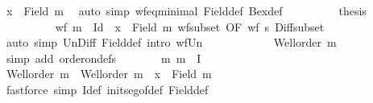 \begin{isabellebody}
\ {\isacartoucheopen}x\ {\isasymnotin}\ Field\ m{\isacartoucheclose}\ \isamarkupfalse%
\ {\isacharparenleft}{\kern0pt}auto\ simp{\isacharcolon}{\kern0pt}\ wf{\isacharunderscore}{\kern0pt}eq{\isacharunderscore}{\kern0pt}minimal\ Field{\isacharunderscore}{\kern0pt}def\ Bex{\isacharunderscore}{\kern0pt}def{\isacharparenright}{\kern0pt}\isanewline
\ \ \ \ \ \ \isamarkupfalse%
\ \isamarkupfalse%
\ {\isacharquery}{\kern0pt}thesis\isanewline
\ \ \ \ \ \ \ \ \isamarkupfalse%
\ {\isacartoucheopen}wf\ {\isacharparenleft}{\kern0pt}m\ {\isacharminus}{\kern0pt}\ Id{\isacharparenright}{\kern0pt}{\isacartoucheclose}\ \ {\isacartoucheopen}x\ {\isasymnotin}\ Field\ m{\isacartoucheclose}\ wf{\isacharunderscore}{\kern0pt}subset\ {\isacharbrackleft}{\kern0pt}OF\ {\isacartoucheopen}wf\ {\isacharquery}{\kern0pt}s{\isacartoucheclose}\ Diff{\isacharunderscore}{\kern0pt}subset{\isacharbrackright}{\kern0pt}\isanewline
\ \ \ \ \ \ \ \ \isamarkupfalse%
\ {\isacharparenleft}{\kern0pt}auto\ simp{\isacharcolon}{\kern0pt}\ Un{\isacharunderscore}{\kern0pt}Diff\ Field{\isacharunderscore}{\kern0pt}def\ intro{\isacharcolon}{\kern0pt}\ wf{\isacharunderscore}{\kern0pt}Un{\isacharparenright}{\kern0pt}\isanewline
\ \ \ \ \isamarkupfalse%
\isanewline
\ \ \ \ \isamarkupfalse%
\ \isamarkupfalse%
\ {\isachardoublequoteopen}Well{\isacharunderscore}{\kern0pt}order\ {\isacharquery}{\kern0pt}m{\isachardoublequoteclose}\isanewline
\ \ \ \ \ \ \isamarkupfalse%
\ {\isacharparenleft}{\kern0pt}simp\ add{\isacharcolon}{\kern0pt}\ order{\isacharunderscore}{\kern0pt}on{\isacharunderscore}{\kern0pt}defs{\isacharparenright}{\kern0pt}\isanewline
%
\isanewline
\ \ \ \ \isamarkupfalse%
\ \isamarkupfalse%
\ {\isachardoublequoteopen}{\isacharparenleft}{\kern0pt}m{\isacharcomma}{\kern0pt}\ {\isacharquery}{\kern0pt}m{\isacharparenright}{\kern0pt}\ {\isasymin}\ I{\isachardoublequoteclose}\isanewline
\ \ \ \ \ \ \isamarkupfalse%
\ {\isacartoucheopen}Well{\isacharunderscore}{\kern0pt}order\ {\isacharquery}{\kern0pt}m{\isacartoucheclose}\ \ {\isacartoucheopen}Well{\isacharunderscore}{\kern0pt}order\ m{\isacartoucheclose}\ \ {\isacartoucheopen}x\ {\isasymnotin}\ Field\ m{\isacartoucheclose}\isanewline
\ \ \ \ \ \ \isamarkupfalse%
\ {\isacharparenleft}{\kern0pt}fastforce\ simp{\isacharcolon}{\kern0pt}\ I{\isacharunderscore}{\kern0pt}def\ init{\isacharunderscore}{\kern0pt}seg{\isacharunderscore}{\kern0pt}of{\isacharunderscore}{\kern0pt}def\ Field{\isacharunderscore}{\kern0pt}def{\isacharparenright}{\kern0pt}\isanewline

\end{isabellebody}
